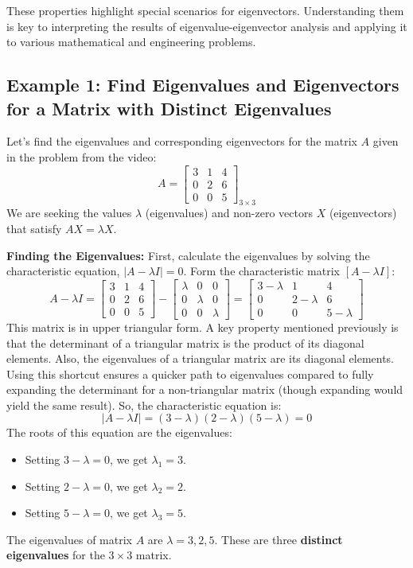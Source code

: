 \documentclass{article}
\begin{document}
These properties highlight special scenarios for eigenvectors. Understanding them is key to interpreting the results of eigenvalue-eigenvector analysis and applying it to various mathematical and engineering problems.

\subsection{Example 1: Find Eigenvalues and Eigenvectors for a Matrix with Distinct Eigenvalues} %

Let's find the eigenvalues and corresponding eigenvectors for the matrix $A$ given in the problem from the video:
\[ A = \begin{bmatrix} 3 & 1 & 4 \\ 0 & 2 & 6 \\ 0 & 0 & 5 \end{bmatrix}_{3 \times 3} \]
We are seeking the values $\lambda$ (eigenvalues) and non-zero vectors $X$ (eigenvectors) that satisfy $AX = \lambda X$.

\textbf{Finding the Eigenvalues:}
First, calculate the eigenvalues by solving the characteristic equation, $|A - \lambda I| = 0$.
Form the characteristic matrix $[A - \lambda I]$:
\[ A - \lambda I = \begin{bmatrix} 3 & 1 & 4 \\ 0 & 2 & 6 \\ 0 & 0 & 5 \end{bmatrix} - \begin{bmatrix} \lambda & 0 & 0 \\ 0 & \lambda & 0 \\ 0 & 0 & \lambda \end{bmatrix} = \begin{bmatrix} 3 - \lambda & 1 & 4 \\ 0 & 2 - \lambda & 6 \\ 0 & 0 & 5 - \lambda \end{bmatrix} \]
This matrix is in upper triangular form. A key property mentioned previously is that the determinant of a triangular matrix is the product of its diagonal elements. Also, the eigenvalues of a triangular matrix are its diagonal elements. Using this shortcut ensures a quicker path to eigenvalues compared to fully expanding the determinant for a non-triangular matrix (though expanding would yield the same result).
So, the characteristic equation is:
\[ |A - \lambda I| = (3 - \lambda)(2 - \lambda)(5 - \lambda) = 0 \]
The roots of this equation are the eigenvalues:
\begin{itemize}
    \item Setting $3 - \lambda = 0$, we get $\lambda_1 = 3$.
    \item Setting $2 - \lambda = 0$, we get $\lambda_2 = 2$.
    \item Setting $5 - \lambda = 0$, we get $\lambda_3 = 5$.
\end{itemize}
The eigenvalues of matrix $A$ are $\lambda = 3, 2, 5$. These are three \textbf{distinct eigenvalues} for the $3 \times 3$ matrix.
\end{document}
